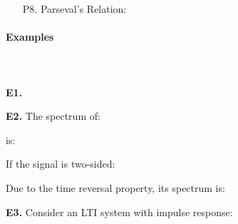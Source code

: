 \begin{enumerate}
	
	{\bf Proof of (a):} 
	\begin{eqnarray}
	{\cal F}[x[n]*y[n]]&=&\sum_{n=-\infty}^{+\infty} \left[\sum_{m=-\infty}^{+\infty}
		x[m]y[n-m]\;\right]e^{-\mathrm{i}n\omega}
		\nonumber \\
	 &=& \sum_{m=-\infty}^{+\infty} x[m] \left[\sum_{n=-\infty}^{+\infty}
		y[n-m]e^{-\mathrm{i}(n-m)\omega}\right] e^{-\mathrm{i}m\omega}
		\nonumber \\
	 &=& X(\mathrm{i}\omega)\;Y(\mathrm{i}\omega)
		\nonumber
	\end{eqnarray}
	
	{\bf Proof of (b):}
	\begin{eqnarray}
	{\cal F}[x[n]y[n]]&=&\sum_{n=-\infty}^{+\infty} x[n]y[n] e^{-\mathrm{i}n\omega}
		=\sum_{n=-\infty}^{+\infty} 
	\left[\frac{1}{2\pi}\int\limits_0^{2\pi}X(\mathrm{i}\omega')e^{\mathrm{i}n\omega'} \mathrm{d}\omega'\right]
		y[n] e^{-\mathrm{i}n\omega} 
		\nonumber \\
	 &=& \frac{1}{2\pi}\int\limits_0^{2\pi}X(\mathrm{i}\omega')\left[\sum_{n=-\infty}^{+\infty} e^{\mathrm{i}n\omega'}  y[n] e^{-\mathrm{i}n\omega}\right] \mathrm{d}\omega'
	 	\nonumber \\
	 &=& \frac{1}{2\pi}\int\limits_0^{2\pi}X(\mathrm{i}\omega')\sum_{n=-\infty}^{+\infty} y[n] e^{-\mathrm{i}n(\omega-\omega')} \mathrm{d}\omega'
		\nonumber \\
	 &=& \frac{1}{2\pi}\int\limits_0^{2\pi}X(\mathrm{i}\omega')Y(\mathrm{i}(\omega-\omega')) \mathrm{d}\omega' 
		=X(\mathrm{i}\omega)*Y(\mathrm{i}\omega)
		\nonumber
	\end{eqnarray}
	
	\item[P8.] Parseval's Relation:
	
	\end{enumerate}
	
	\paragraph{Examples}\mbox{}\\\\
	
	{\bf E1.} 
	
	
	{\bf E2.} The spectrum of:
	
	is:
	
	If the signal is two-sided:
	
	Due to the time reversal property, its spectrum is:
	
	
	{\bf E3.} Consider an LTI system with impulse response:
	
